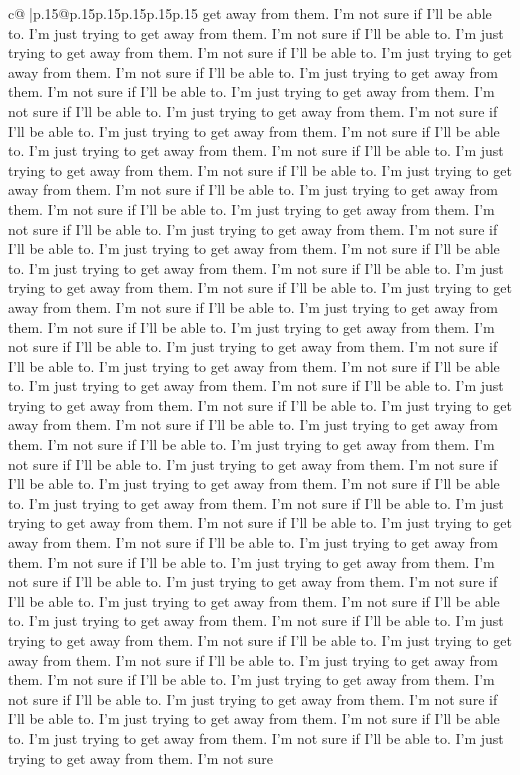 \documentclass{article}
\begin{document}
{\begin{supertabular}{c@{$\;$}|p{.15\linewidth}@{}p{.15\linewidth}p{.15\linewidth}p{.15\linewidth}p{.15\linewidth}p{.15\linewidth}}
{{{get away from them. I'm not sure if I'll be able to. I'm just trying to get away from them. I'm not sure if I'll be able to. I'm just trying to get away from them. I'm not sure if I'll be able to. I'm just trying to get away from them. I'm not sure if I'll be able to. I'm just trying to get away from them. I'm not sure if I'll be able to. I'm just trying to get away from them. I'm not sure if I'll be able to. I'm just trying to get away from them. I'm not sure if I'll be able to. I'm just trying to get away from them. I'm not sure if I'll be able to. I'm just trying to get away from them. I'm not sure if I'll be able to. I'm just trying to get away from them. I'm not sure if I'll be able to. I'm just trying to get away from them. I'm not sure if I'll be able to. I'm just trying to get away from them. I'm not sure if I'll be able to. I'm just trying to get away from them. I'm not sure if I'll be able to. I'm just trying to get away from them. I'm not sure if I'll be able to. I'm just trying to get away from them. I'm not sure if I'll be able to. I'm just trying to get away from them. I'm not sure if I'll be able to. I'm just trying to get away from them. I'm not sure if I'll be able to. I'm just trying to get away from them. I'm not sure if I'll be able to. I'm just trying to get away from them. I'm not sure if I'll be able to. I'm just trying to get away from them. I'm not sure if I'll be able to. I'm just trying to get away from them. I'm not sure if I'll be able to. I'm just trying to get away from them. I'm not sure if I'll be able to. I'm just trying to get away from them. I'm not sure if I'll be able to. I'm just trying to get away from them. I'm not sure if I'll be able to. I'm just trying to get away from them. I'm not sure if I'll be able to. I'm just trying to get away from them. I'm not sure if I'll be able to. I'm just trying to get away from them. I'm not sure if I'll be able to. I'm just trying to get away from them. I'm not sure if I'll be able to. I'm just trying to get away from them. I'm not sure if I'll be able to. I'm just trying to get away from them. I'm not sure if I'll be able to. I'm just trying to get away from them. I'm not sure if I'll be able to. I'm just trying to get away from them. I'm not sure if I'll be able to. I'm just trying to get away from them. I'm not sure if I'll be able to. I'm just trying to get away from them. I'm not sure if I'll be able to. I'm just trying to get away from them. I'm not sure if I'll be able to. I'm just trying to get away from them. I'm not sure if I'll be able to. I'm just trying to get away from them. I'm not sure if I'll be able to. I'm just trying to get away from them. I'm not sure if I'll be able to. I'm just trying to get away from them. I'm not sure if I'll be able to. I'm just trying to get away from them. I'm not sure if I'll be able to. I'm just trying to get away from them. I'm not sure if I'll be able to. I'm just trying to get away from them. I'm not sure if I'll be able to. I'm just trying to get away from them. I'm not sure if I'll be able to. I'm just trying to get away from them. I'm not sure if I'll be able to. I'm just trying to get away from them. I'm not sure }}}
\end{supertabular}}
\end{document}
